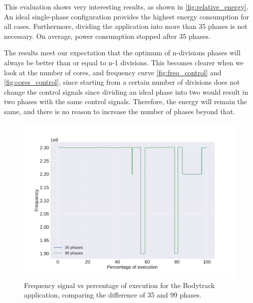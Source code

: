 This evaluation shows very interesting results, as shown in \cref{fig:relative_energy}. An ideal single-phase configuration provides the highest energy consumption for all cases. Furthermore, dividing the application into more than 35 phases is not necessary. On average, power consumption stopped after 35 phases.


The results meet our expectation that the optimum of n-divisions phases will always be better than or equal to n-1 divisions. This becomes clearer when we look at the number of cores, and frequency curve \cref{fig:freq_control} and \cref{fig:cores_control}, since starting from a certain number of divisions does not change the control signals since dividing an ideal phase into two would result in two phases with the same control signals. Therefore, the energy will remain the same, and there is no reason to increase the number of phases beyond that.

\begin{figure}[h]
	\centering
	\includegraphics[width=\columnwidth]{phases/figures/signals/completo_bodytrack_1_freq_signals_cmp.pdf}
	\caption{Frequency signal vs percentage of execution for the Bodytrack application, comparing the difference of 35 and 99 phases.}
\end{figure}%

